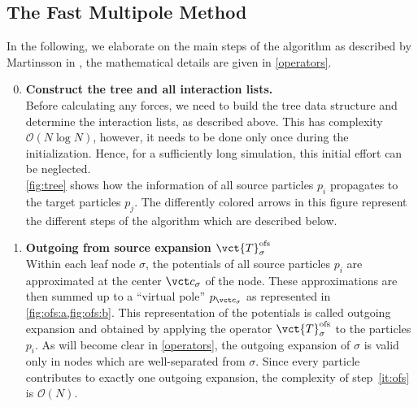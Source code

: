 \subsection{The Fast Multipole Method}

In the following, we elaborate on the main steps of the algorithm as described by Martinsson in \cite{Martinsson2015}, the mathematical details are given in \cref{operators}.

\begin{enumerate}
  \setcounter{enumi}{-1}

  \item \textbf{Construct the tree and all interaction lists.}
    \\
    Before calculating any forces, we need to build the tree data structure and determine the interaction lists, as described above.
    This has complexity $\mathcal{O}(N\log{N})$, however, it needs to be done only once during the initialization. Hence, for a sufficiently long simulation, this initial effort can be neglected.
    \\
    \cref{fig:tree} shows how the information of all source particles $p_i$ propagates to the target particles $p_j$.
    The differently colored arrows in this figure represent the different steps of the algorithm which are described below.
    
    \label{it:init}

  \item \textbf{Outgoing from source expansion $\vct{T}_{\sigma}^{\mathrm{ofs}}$}
    \\
    Within each leaf node $\sigma$, the potentials of all source particles $p_i$ are approximated at the center $\vct c_\sigma$ of the node.
    These approximations are then summed up to a ``virtual pole'' $p_{\vct c_\sigma}$ as represented in \cref{fig:ofs:a,fig:ofs:b}.
    This representation of the potentials is called outgoing expansion and obtained by applying the operator $\vct{T}_{\sigma}^{\mathrm{ofs}}$ to the particles $p_i$.
    As will become clear in \cref{operators}, the outgoing expansion of $\sigma$ is valid only in nodes which are well-separated from $\sigma$.
    Since every particle contributes to exactly one outgoing expansion, the complexity of step~\ref{it:ofs} is $\mathcal{O}(N)$.


\end{enumerate}
